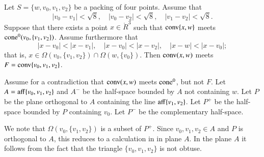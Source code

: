 \begin{tarskidata}
\begin{tarski}
\begin{lemma}
Let $S=\{w,v_0,v_1,v_2\}$ be a packing of four points.
Assume that
   $$
   |v_0-v_1| < \sqrt8,\quad |v_0-v_2| < \sqrt8,\quad |v_1-v_2| < \sqrt8.
   $$
Suppose that there exists a point $x\in\ring{R}^3$
such that 
  ${\operatorname{conv}}\{x,w\}$ meets ${\operatorname{cone}}^0(v_0,\{v_1,v_2\})$.  
Assume furthermore that
  $$
  |x-v_0| < |x-v_1|,\quad 
  |x-v_0| < |x-v_2|,\quad
  |x-w| < |x-v_0|;
  $$
that is, $x\in\Omega(v_0,\{v_1,v_2\})\cap \Omega(w,\{v_0\})$.
Then ${\operatorname{conv}}(x,w)$ meets $F={\operatorname{conv}}\{v_0,v_1,v_2\}$.
\end{lemma}


\begin{proved} 
Assume for a contradiction that ${\operatorname{conv}}(x,w)$ meets ${\operatorname{cone}}^0$,
but not $F$.  Let $A = {\operatorname{aff}}\{v_0,v_1,v_2\}$ and $A^-$
be the half-space bounded by $A$ not containing $w$. 
Let $P$
be the plane orthogonal to $A$ containing the line ${\operatorname{aff}}\{v_1,v_2\}$.
Let $P^+$ be the half-space bounded by $P$ containing $v_0$.  Let
$P^-$ be the complementary half-space.

We note that $\Omega(v_0,\{v_1,v_2\})$ is a subset of $P^+$.  Since
$v_0,v_1,v_2\in A$ and $P$ is orthogonal to $A$, this reduces to
a calculation in in plane $A$.  In the plane $A$ it follows from
the fact that the triangle $\{v_0,v_1,v_2\}$ is not obtuse.


\end{proved}
\end{tarski}
\end{tarskidata}
